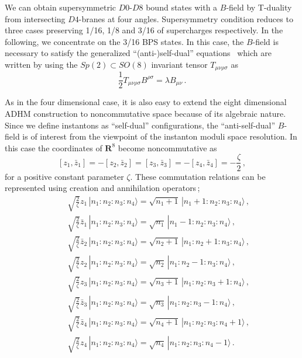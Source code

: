 \documentclass[a4paper,12pt]{article}
\begin{document}
We can obtain supersymmetric $D0$-$D8$ bound states 
with a $B$-field by T-duality from intersecting $D4$-branes at four angles.
Supersymmetry condition reduces to three cases 
preserving 1/16, 1/8 and 3/16 of supercharges respectively.
In the following, we concentrate on the 3/16 BPS states. 
In this case, the $B$-field is necessary to satisfy 
the generalized ``(anti-)self-dual'' 
equations~\cite{cdfn, ward, hull} which 
are written by using the $Sp(2)\subset SO(8)$ invariant tensor 
$T_{\mu\nu\rho\sigma}$ as 
\begin{equation}
\frac{1}{2}T_{\mu\nu\rho\sigma} B^{\rho\sigma}=\lambda B_{\mu\nu}\,.
\end{equation}

As in the four dimensional case, 
it is also easy to extend the eight dimensional ADHM construction 
to noncommutative space because of its algebraic nature.
Since we define instantons as ``self-dual'' configurations, 
the ``anti-self-dual'' $B$-field is of interest from the viewpoint of 
the instanton moduli space resolution.
In this case the coordinates of $\mathbf{R}^8$ become noncommutative as
\begin{equation}
\left[ z_1,\bar{z}_1\right]=-\left[ z_2,\bar{z}_2\right]=
\left[ z_3,\bar{z}_3\right]=-\left[ z_4,\bar{z}_4\right]=-\frac{\zeta}{2}\,,
\end{equation}
for a positive constant parameter $\zeta$.
These commutation relations can be represented using creation and annihilation 
operators\,;
\begin{eqnarray}
& &  \sqrt{\frac{2}{\zeta}} z_1\,|n_1:n_2:n_3:n_4\rangle =\sqrt{ n_1+1}\,
|n_1+1:n_2:n_3:n_4\rangle\,,\nonumber\\ 
& &  \sqrt{\frac{2}{\zeta}} \bar{z}_1\,|n_1:n_2:n_3:n_4\rangle =\sqrt{ n_1}\,
|n_1-1:n_2:n_3:n_4\rangle\,,\nonumber\\
& & \sqrt{\frac{2}{\zeta}} \bar{z}_2\,|n_1:n_2:n_3:n_4\rangle =\sqrt{ n_2+1}\,
|n_1:n_2+1:n_3:n_4\rangle\,,\nonumber\\
& &  \sqrt{\frac{2}{\zeta}} z_2\,|n_1:n_2:n_3:n_4\rangle =\sqrt{ n_2}\,
|n_1:n_2-1:n_3:n_4\rangle\,,\\
& & \sqrt{\frac{2}{\zeta}} z_3\,|n_1:n_2:n_3:n_4\rangle =\sqrt{ n_3+1}\,
|n_1:n_2:n_3+1:n_4\rangle\,,\nonumber\\ 
& & \sqrt{\frac{2}{\zeta}} \bar{z}_3\,|n_1:n_2:n_3:n_4\rangle =\sqrt{ n_3}\,
|n_1:n_2:n_3-1:n_4\rangle\,,\nonumber\\
& & \sqrt{\frac{2}{\zeta}} \bar{z}_4\,|n_1:n_2:n_3:n_4\rangle =\sqrt{ n_4+1}\,
|n_1:n_2:n_3:n_4+1\rangle\,,\nonumber\\ 
& & \sqrt{\frac{2}{\zeta}} z_4\,|n_1:n_2:n_3:n_4\rangle =\sqrt{ n_4}\,
|n_1:n_2:n_3:n_4-1\rangle\,.\nonumber
\end{eqnarray}
\end{document}
